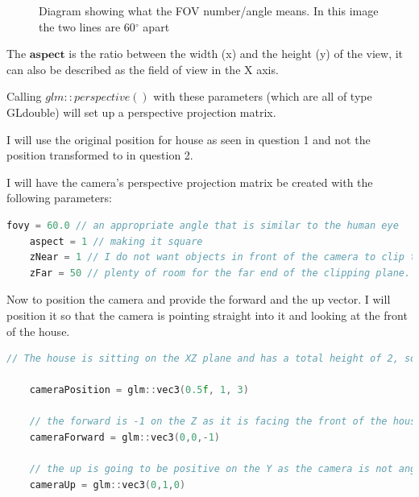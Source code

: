 \documentclass[10pt]{report}
\begin{document}
\begin{figure}[H]
    \centering
    \caption{Diagram showing what the FOV number/angle means. In this image the two lines are 60$^{\circ}$ apart}
\end{figure}

The \(\textbf{aspect}\) is the ratio between the width (x) and the height (y) of the view, it can also be described as the field of view in the X axis.

Calling \(glm::perspective()\) with these parameters (which are all of type GLdouble) will set up a perspective projection matrix.

I will use the original position for house as seen in question 1 and not the position transformed to in question 2.

I will have the camera's perspective projection matrix be created with the following parameters: 
\begin{lstlisting}[language = c]
    fovy = 60.0 // an appropriate angle that is similar to the human eye
    aspect = 1 // making it square
    zNear = 1 // I do not want objects in front of the camera to clip to early
    zFar = 50 // plenty of room for the far end of the clipping plane.
\end{lstlisting}

Now to position the camera and provide the forward and the up vector. I will position it so that the camera is pointing straight into it and looking at the front of the house.
\begin{lstlisting}[language = c]
    // The house is sitting on the XZ plane and has a total height of 2, so I placed the camera on the center with 1 on the Y axis. As the house goes from 0 to 1 on the X, I decided to place the camera in the center, this being 0.5. As the house already extrudes by 1 on the Z axis, I moved the camera back by 2 extra points to make sure that the house will fit into the FOV, making it 3 on the Z.

    cameraPosition = glm::vec3(0.5f, 1, 3) 

    // the forward is -1 on the Z as it is facing the front of the house that has a normal of (0,0,1)
    cameraForward = glm::vec3(0,0,-1) 

    // the up is going to be positive on the Y as the camera is not angled.
    cameraUp = glm::vec3(0,1,0) 
\end{lstlisting}
\end{document}
